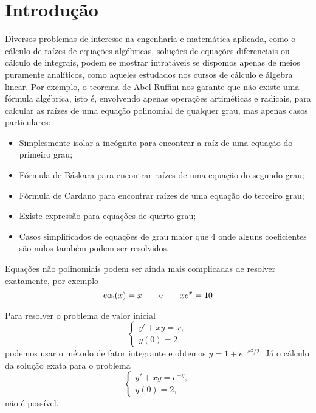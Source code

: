 \chapter{Introdução}

Diversos problemas de interesse na engenharia e matemática aplicada, como  o cálculo de raízes de equações algébricas, soluções de equações diferenciais ou cálculo de integrais, podem se mostrar intratáveis se dispomos apenas de meios puramente analíticos, como aqueles estudados nos cursos de cálculo e álgebra linear. Por exemplo, o teorema de Abel-Ruffini nos garante que não existe uma fórmula algébrica, isto é, envolvendo apenas operações artiméticas e radicais, para calcular as raízes de uma equação polinomial de qualquer grau, mas apenas casos particulares:
\begin{itemize}
\item Simplesmente isolar a incógnita para encontrar a raíz de uma equação do primeiro grau;
\item Fórmula de Báskara para encontrar raízes de uma equação do segundo grau;
\item Fórmula de Cardano para encontrar raízes de uma equação do terceiro grau;
\item Existe expressão para equações de quarto grau;
\item Casos simplificados de equações de grau maior que 4 onde alguns coeficientes são nulos também podem ser resolvidos.
\end{itemize}

Equações não polinomiais podem ser ainda mais complicadas de resolver exatamente, por exemplo
\begin{equation}
\cos(x)=x\qquad \hbox{e}\qquad xe^x= 10
\end{equation}

Para resolver o problema de valor inicial
\begin{equation}
\left\{
\begin{array}{l}
y'+xy=x,\\
y(0)=2,
\end{array}\right.
\end{equation}
podemos usar o método de fator integrante e obtemos $y=1+e^{-x^2/2}$. Já o cálculo da solução exata para o problema 
\begin{equation}
\left\{
\begin{array}{l}
y'+xy=e^{-y},\\
y(0)=2,
\end{array}\right.
\end{equation}
não é possível.


